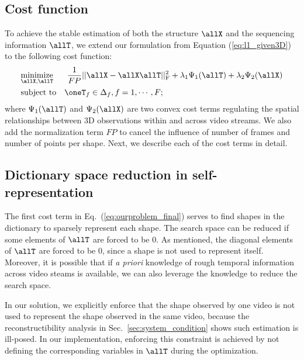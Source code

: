 \subsection{Cost function}
To achieve the stable estimation of both the structure $\allX$ and the sequencing information $\allT$, we extend our formulation from Equation (\ref{eq:l1_given3D}) to the following cost function:
\begin{equation}
\begin{aligned}
& \underset{\allX, \allT}{\text{minimize}}&& ~ \frac{1}{FP} || \allX - \allX\allT||_\text{F}^2
 + \lambda_1\Psi_1(\allT) + \lambda_2 \Psi_2(\allX) \\
& \text{subject to} && \oneT_f \in \Delta_f, f=1,\cdots,F;
\end{aligned}
\label{eq:ourproblem_final}
\end{equation}
where $\Psi_1(\allT)$ and  $\Psi_2(\allX)$ are two convex cost terms regulating the spatial relationships between 3D observations within and across video streams. We also add the normalization term $FP$ to cancel the influence of number of frames and number of points per shape. Next, we describe each of the cost terms in detail.

\subsection{Dictionary space reduction in self-representation}
The first cost term in Eq.~(\ref{eq:ourproblem_final}) serves to find shapes in the dictionary to sparsely represent each shape. The search space can be reduced if some elements of $\allT$ are forced to be 0. As mentioned, the diagonal elements of $\allT$ are forced to be 0, since a shape is not used to represent itself. Moreover, it is possible that if {\em a priori} knowledge of rough temporal information across video steams is available, we can also leverage the knowledge to reduce the search space.

In our solution, we explicitly enforce that the shape observed by one video is not used to represent the shape observed in the same video, because 
the reconstructibility analysis in Sec.~\ref{sec:system_condition} shows such estimation is ill-posed. In our implementation, enforcing this constraint is achieved by not defining the corresponding variables in $\allT$ during the optimization.

